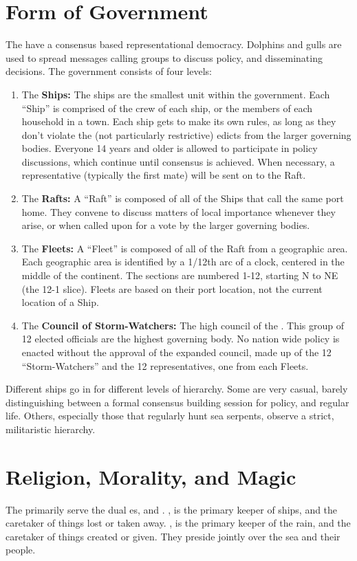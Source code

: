 \documentclass[blue]{GL2020}
\begin{document}
\section*{Form of Government} 
The \pShippies{} have a consensus based representational democracy. Dolphins and gulls are used to spread messages calling groups to discuss policy, and disseminating decisions. The government consists of four levels:

\begin{enumerate}	
	\item The \textbf{Ships:} The ships are the smallest unit within the \pShip{} government. Each ``Ship'' is comprised of the crew of each ship, or the members of each household in a town. Each ship gets to make its own rules, as long as they don’t violate the (not particularly restrictive) edicts from the larger governing bodies. Everyone 14 years and older is allowed to participate in policy discussions, which continue until consensus is achieved. When necessary, a representative (typically the first mate) will be sent on to the Raft.
		\item The \textbf{Rafts:} A ``Raft'' is composed of all of the Ships that call the same port home. They convene to discuss matters of local importance whenever they arise, or when called upon for a vote by the larger governing bodies.
		\item The \textbf{Fleets:} A ``Fleet'' is composed of all of the Raft from a geographic area. Each geographic area is identified by a 1/12th arc of a clock, centered in the middle of the continent. The sections are numbered 1-12, starting N to NE (the 12-1 slice). Fleets are based on their port location, not the current location of a Ship.
		\item The \textbf{Council of Storm-Watchers:} The high council of the \pShip{}. This group of 12 elected officials are the highest governing body. No nation wide policy is enacted without the approval of the expanded council, made up of the 12 ``Storm-Watchers'' and the 12 representatives, one from each Fleets.
\end{enumerate}

Different ships go in for different levels of hierarchy. Some are very casual, barely distinguishing between a formal consensus building session for policy, and regular life. Others, especially those that regularly hunt sea serpents, observe a strict, militaristic hierarchy.

\section*{Religion, Morality, and Magic}
The \pShippies{} primarily serve the dual \cEbb{\God}es, \cEbb{} and \cFlow{}. \cEbbFull{\MYname}, is the primary keeper of ships, and the caretaker of things lost or taken away. \cFlowFull{\MYname}, is the primary keeper of the rain, and the caretaker of things created or given. They preside jointly over the sea and their people.
\end{document}
